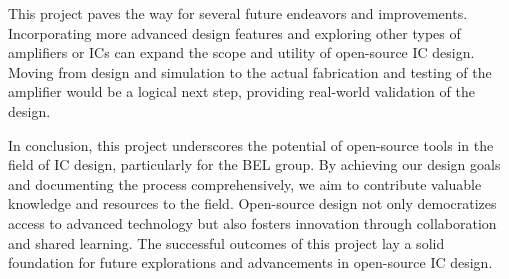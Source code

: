This project paves the way for several future endeavors and improvements. Incorporating more advanced design features and exploring other types of amplifiers or ICs can expand the scope and utility of open-source IC design. Moving from design and simulation to the actual fabrication and testing of the amplifier would be a logical next step, providing real-world validation of the design.

In conclusion, this project underscores the potential of open-source tools in the field of IC design, particularly for the BEL group. By achieving our design goals and documenting the process comprehensively, we aim to contribute valuable knowledge and resources to the field. Open-source design not only democratizes access to advanced technology but also fosters innovation through collaboration and shared learning. The successful outcomes of this project lay a solid foundation for future explorations and advancements in open-source IC design.